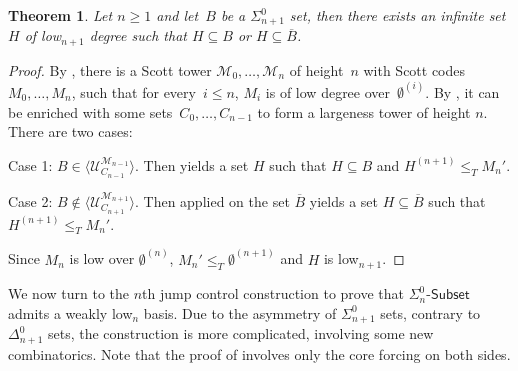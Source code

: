 \documentclass{article}
\def\U{\mathcal{U}}
\def\M{\mathcal{M}}
\newcommand{\Sub}[1]{{#1}\mbox{-}\mathsf{Subset}}
\newtheorem{theorem}{Theorem}
\numberwithin{theorem}{section}
\theoremstyle{definition}
\begin{document}
\begin{theorem}
Let $n \geq 1$ and let~$B$ be a $\Sigma_{n+1}^0$ set, then there exists an infinite set $H$ of low${}_{n+1}$ degree such that $H \subseteq B$ or $H \subseteq \overline{B}$.   
\end{theorem}

\begin{proof}
By , there is a Scott tower $\M_0, \dots, \M_n$ of height~$n$ with Scott codes~$M_0, \dots, M_n$, such that for every~$i \leq n$, $M_i$ is of low degree over~$\emptyset^{(i)}$.
By , it can be enriched with some sets~$C_0, \dots, C_{n-1}$ to form a largeness tower of height $n$. There are two cases:

Case 1: $B \in \langle \U_{C_{n-1}}^{\M_{n-1}} \rangle$. Then  yields a set $H$ such that $H \subseteq B$ and $H^{(n+1)} \leq_T M_n'$.

Case 2: $B \notin \langle \U_{C_{n+1}}^{\M_{n+1}} \rangle$. Then  applied on the set $\overline{B}$ yields a set $H \subseteq \overline{B}$ such that $H^{(n+1)} \leq_T M_n'$.

Since $M_n$ is low over $\emptyset^{(n)}$, $M_n' \leq_T \emptyset^{(n+1)}$ and $H$ is low$_{n+1}$.
\end{proof}

We now turn to the $n$th jump control construction to prove that $\Sub{\Sigma^0_n}$ admits a weakly low${}_n$ basis. Due to the asymmetry of $\Sigma^0_{n+1}$ sets, contrary to $\Delta^0_{n+1}$ sets, the construction is more complicated, involving some new combinatorics. Note that the proof of  involves only the core forcing on both sides.
\end{document}
